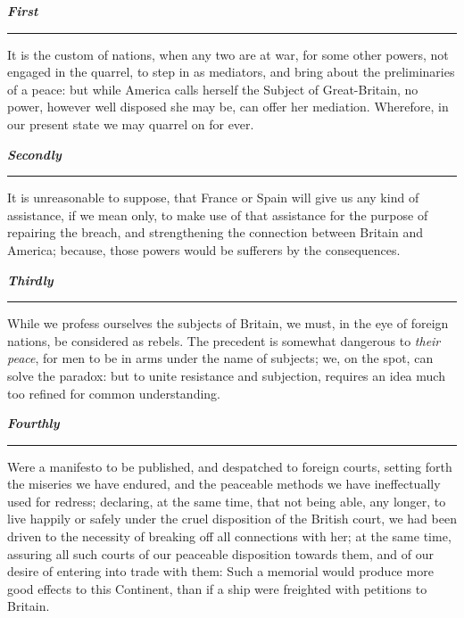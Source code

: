 \documentclass[12pt, twocolumn]{book}
\begin{document}
    {\begin{adjustwidth}{0.5em}{0.5em} \small

        \textit{\textbf{First}}
        \noindent \rule{40pt}{0.5pt}

        It is the custom of nations, when any two are at war, for some other powers, not engaged in the quarrel, to step in as mediators, and bring about the preliminaries of a peace: but while America calls herself the Subject of Great-Britain, no power, however well disposed she may be, can offer her mediation. Wherefore, in our present state we may quarrel on for ever.

        \bigskip

        \noindent \textit{\textbf{Secondly}}
        \noindent \rule{40pt}{0.5pt}

        It is unreasonable to suppose, that France or Spain will give us any kind of assistance, if we mean only, to make use of that assistance for the purpose of repairing the breach, and strengthening the connection between Britain and America; because, those powers would be sufferers by the consequences.

        \bigskip

        \noindent \textit{\textbf{Thirdly}}
        \noindent \rule{40pt}{0.5pt}

        While we profess ourselves the subjects of Britain, we must, in the eye of foreign nations, be considered as rebels. The precedent is somewhat dangerous to \textit{their peace}, for men to be in arms under the name of subjects; we, on the spot, can solve the paradox: but to unite resistance and subjection, requires an idea much too refined for common understanding.

        \bigskip

        \noindent \textit{\textbf{Fourthly}}
        \noindent \rule{40pt}{0.5pt}

        Were a manifesto to be published, and despatched to foreign courts, setting forth the miseries we have endured, and the peaceable methods we have ineffectually used for redress; declaring, at the same time, that not being able, any longer, to live happily or safely under the cruel disposition of the British court, we had been driven to the necessity of breaking off all connections with her; at the same time, assuring all such courts of our peaceable disposition towards them, and of our desire of entering into trade with them: Such a memorial would produce more good effects to this Continent, than if a ship were freighted with petitions to Britain.

    \end{adjustwidth}}
\end{document}
